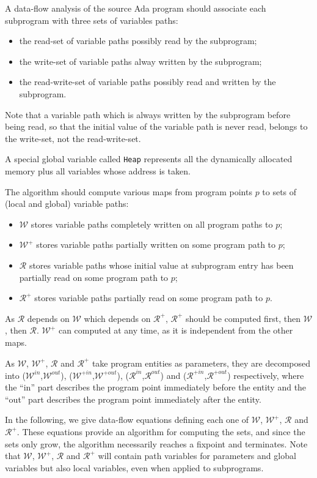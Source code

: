 \documentclass{article}
\newcommand{\code}[1]{\texttt{#1}}
\newcommand{\heap}{\code{Heap}\xspace}
\newcommand{\allwrites}{$\mathcal{W^+}$\xspace}
\newcommand{\Outallwrites}{\ensuremath{\mathcal{W}^{+out}}\xspace}
\newcommand{\Inallwrites}{\ensuremath{\mathcal{W}^{+in}}\xspace}
\newcommand{\writes}{$\mathcal{W}$\xspace}
\newcommand{\Outwrites}{\ensuremath{\mathcal{W}^{out}}\xspace}
\newcommand{\Inwrites}{\ensuremath{\mathcal{W}^{in}}\xspace}
\newcommand{\allreads}{$\mathcal{R^+}$\xspace}
\newcommand{\Outallreads}{\ensuremath{\mathcal{R}^{+out}}\xspace}
\newcommand{\Inallreads}{\ensuremath{\mathcal{R}^{+in}}\xspace}
\newcommand{\reads}{$\mathcal{R}$\xspace}
\newcommand{\Inreads}{\ensuremath{\mathcal{R}^{in}}\xspace}
\newcommand{\Outreads}{\ensuremath{\mathcal{R}^{out}}\xspace}
\begin{document}
A data-flow analysis of the source Ada program should associate each subprogram
with three sets of variables paths:
\begin{itemize}
\item the read-set of variable paths possibly read by the subprogram;
\item the write-set of variable paths alway written by the subprogram;
\item the read-write-set of variable paths possibly read and written by
  the subprogram.
\end{itemize}

Note that a variable path which is always written by the subprogram before
being read, so that the initial value of the variable path is never read,
belongs to the write-set, not the read-write-set.

A special global variable called \heap represents all the dynamically allocated
memory plus all variables whose address is taken.

The algorithm should compute various maps from program points $p$ to sets of
(local and global) variable paths:
\begin{itemize}
\item \writes stores variable paths completely written on all program paths
  to $p$;
\item \allwrites stores variable paths partially written on some program
  path to $p$;
\item \reads stores variable paths whose initial value at subprogram entry has
  been partially read on some program path to $p$;
\item \allreads stores variable paths partially read on some program path to
  $p$.
\end{itemize}

As \reads depends on \writes which depends on \allreads, \allreads should be
computed first, then \writes, then \reads. \allwrites can computed at any time, as it is independent from the other maps.

As \writes, \allwrites, \reads and
\allreads take program entities as parameters, they are decomposed into
(\Inwrites,\Outwrites), (\Inallwrites,\Outallwrites), (\Inreads,\Outreads) and
(\Inallreads,\Outallreads) respectively, where the ``in'' part describes the
program point immediately before the entity and the ``out'' part describes the
program point immediately after the entity.

In the following, we give data-flow equations defining each one of \writes,
\allwrites, \reads and \allreads. These equations provide an algorithm for
computing the sets, and since the sets only grow, the algorithm necessarily
reaches a fixpoint and terminates. Note that \writes, \allwrites, \reads and
\allreads will contain path variables for parameters and global variables but
also local variables, even when applied to subprograms.
\end{document}
